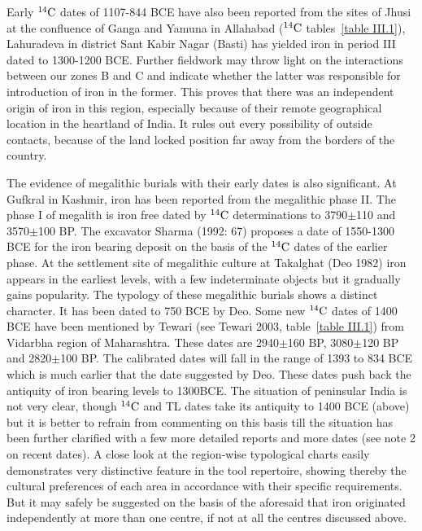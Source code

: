 Early $^{14}{\rm C}$ dates of 1107-844 BCE have also been reported from the sites of Jhusi at the confluence of Ganga and Yamuna in Allahabad ($^{14}{\rm C}$ tables~\ref{table III.1}), Lahuradeva in district Sant Kabir Nagar (Basti) has yielded iron in period III dated to 1300-1200 BCE. Further fieldwork may throw light on the interactions between our zones B and C and indicate whether the latter was responsible for introduction of iron in the former. This proves that there was an independent origin of iron in this region, especially because of their remote geographical location in the heartland of India. It rules out every possibility of outside contacts, because of the land locked position far away from the borders of the country.

The evidence of megalithic burials with their early dates is also significant. At Gufkral in Kashmir, iron has been reported from the megalithic phase II. The phase I of megalith is iron free dated by $^{14}{\rm C}$ determinations to 3790$\pm$110 and 3570$\pm$100 BP. The excavator Sharma (1992: 67) proposes a date of 1550-1300 BCE for the iron bearing deposit on the basis of the $^{14}{\rm C}$ dates of the earlier phase. At the settlement site of megalithic culture at Takalghat (Deo 1982) iron appears in the earliest levels, with a few indeterminate objects but it gradually gains popularity. The typology of these megalithic burials shows a distinct character. It has been dated to 750 BCE by Deo. Some new $^{14}{\rm C}$ dates of 1400 BCE have been mentioned by Tewari (see Tewari 2003, table~\ref{table III.1}) from Vidarbha region of Maharashtra. These dates are 2940$\pm$160 BP, 3080$\pm$120 BP and 2820$\pm$100 BP. The calibrated dates will fall in the range of 1393 to 834 BCE which is much earlier that the date suggested by Deo. These dates push back the antiquity of iron bearing levels to 1300BCE. The situation of peninsular India is not very clear, though $^{14}{\rm C}$ and TL dates take its antiquity to 1400 BCE (above) but it is better to refrain from commenting on this basis till the situation has been further clarified with a few more detailed reports and more dates (see note 2 on recent dates). A close look at the region-wise typological charts easily demonstrates very distinctive feature in the tool repertoire, showing thereby the cultural preferences of each area in accordance with their specific requirements. But it may safely be suggested on the basis of the aforesaid that iron originated independently at more than one centre, if not at all the centres discussed above.

